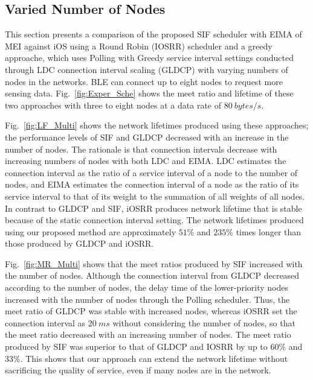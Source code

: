 \documentclass[10pt,journal,compsoc]{IEEEtran}
\begin{document}
\subsection{Varied Number of Nodes}\label{sec:exp-varnode}



This section presents a comparison of the proposed SIF scheduler with EIMA of MEI against iOS using a Round Robin (IOSRR) scheduler and a greedy approache, which uses Polling with Greedy service interval settings conducted through LDC connection interval scaling (GLDCP) with varying numbers of nodes in the networks. BLE can connect up to eight nodes to request more sensing data.
Fig.~\ref{fig:Exper_Sche} shows the meet ratio and lifetime of these two approaches with three to eight nodes at a data rate of $80\ bytes/s$.

Fig.~\ref{fig:LF_Multi} shows the network lifetimes produced using these approaches; the performance levels of SIF and GLDCP decreased with an increase in the number of nodes. The rationale is that connection intervals decrease with increasing numbers of nodes with both LDC and EIMA. LDC estimates the connection interval as the ratio of a service interval of a node to the number of nodes, and EIMA estimates the connection interval of a node as the ratio of its service interval to that of its weight to the summation of all weights of all nodes. In contrast to GLDCP and SIF, iOSRR produces network lifetime that is stable because of the static connection interval setting. The network lifetimes produced using our proposed method are approximately $51\%$ and $235\%$ times longer than those produced by GLDCP and iOSRR.

Fig.~\ref{fig:MR_Multi} shows that the meet ratios produced by SIF increased with the number of nodes. Although the connection interval from GLDCP decreased according to the number of nodes, the delay time of the lower-priority nodes increased with the number of nodes through the Polling scheduler. Thus, the meet ratio of GLDCP was stable with increased nodes, whereas iOSRR set the connection interval as $20~ms$ without considering the number of nodes, so that the meet ratio decreased with an increasing number of nodes. The meet ratio produced by SIF was superior to that of GLDCP and IOSRR by up to $60\%$ and $33\%$. This shows that our approach can extend the network lifetime without sacrificing the quality of service, even if many nodes are in the network.
\end{document}
